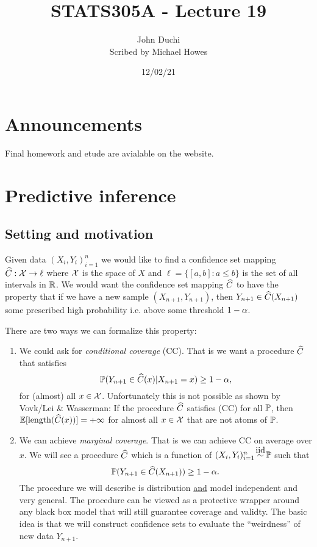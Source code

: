 




\title{STATS305A - Lecture 19}
\author{John Duchi\\ Scribed by Michael Howes}
\date{12/02/21}

\pagestyle{fancy}
\fancyhf{}


\maketitle
\tableofcontents
\section{Announcements}
Final homework and etude are avialable on the website.
\section{Predictive inference}
\subsection{Setting and motivation}
Given data $(X_i,Y_i)_{i=1}^n$ we would like to find a confidence set mapping $\widehat{C}:{\mathcal{X}} \to \ell$ where ${\mathcal{X}}$ is the space of $X$ and $\ell = \{[a,b]: a\le b\}$ is the set of all intervals in ${\mathbb R}$. We would want the confidence set mapping $\widehat{C}$ to have the property that if we have a new sample $(X_{n+1},Y_{n+1})$, then $Y_{n+1} \in \widehat{C}(X_{n+1})$ some prescribed high probability i.e. above some threshold $1-{\alpha}$. 

There are two ways we can formalize this property:
\begin{enumerate}
    \item We could ask for \emph{conditional coverage} (CC). That is we want a procedure $\widehat{C}$ that satisfies 
    \[{\mathbb{P}}(Y_{n+1} \in \widehat{C}(x)|X_{n+1}=x) \ge 1-{\alpha},\] for (almost) all $x \in {\mathcal{X}}$. Unfortunately this is not possible as shown by Vovk/Lei \& Wasserman: If the procedure $\widehat{C}$ satisfies (CC) for all ${\mathbb{P}}$, then ${\mathbb{E}}[\text{length}(\widehat{C}(x))]=+\infty$ for almost all $x \in {\mathcal{X}}$ that are not atoms of ${\mathbb{P}}$. 
    \item We can achieve \emph{marginal coverage}. That is we can achieve CC on average over $x$. We will see a procedure $\widehat{C}$ which is a function of $(X_i,Y_i)_{i=1}^n \iid \Pa$ such that 
    \[{\mathbb{P}}(Y_{n+1}\in \widehat{C}(X_{n+1})) \ge 1-{\alpha}. \]
    The procedure we will describe is distribution \underline{and} model independent and very general. The procedure can be viewed as a protective wrapper around any black box model that will still guarantee coverage and validty. The basic idea is that we will construct confidence sets to evaluate the ``weirdness'' of new data $Y_{n+1}$.
\end{enumerate}
